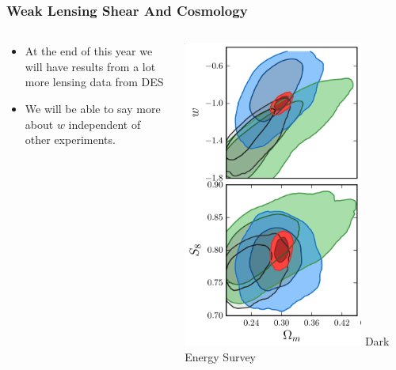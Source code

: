 \documentclass{beamer}
\begin{document}
\frame
{

    \frametitle{Weak Lensing Shear And Cosmology}


    \begin{columns}
        \begin{column}{0.5\textwidth}
            \begin{itemize}

                \item At the end of this year we will have results from a lot
                    more lensing data from DES
                    
                \item We will be able to say more about {\color{gold} $w$}
                    independent of other experiments.

            \end{itemize}

        \end{column}
        \begin{column}{0.5\textwidth}
            \begin{center}
                \includegraphics[width=0.8\textwidth]{des-cosmo-w.png}
                \newline
                {\tiny Dark Energy Survey}
            \end{center}
        \end{column}

    \end{columns}


}
\end{document}
